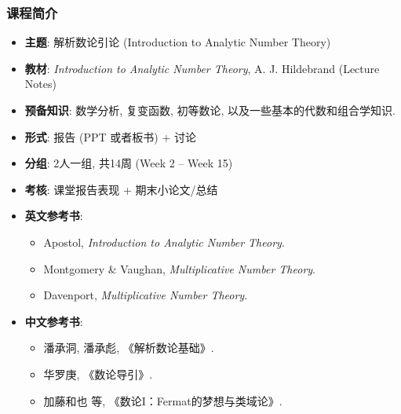 
\begin{frame}
\frametitle{课程简介}

\begin{itemize}
\item \textbf{主题}: 解析数论引论 (Introduction to Analytic Number Theory)
\item \textbf{教材}: \textit{Introduction to Analytic Number Theory}, A. J. Hildebrand (Lecture Notes)
\item \textbf{预备知识}: 数学分析, 复变函数, 初等数论, 以及一些基本的代数和组合学知识.
\item \textbf{形式}: 报告 (PPT 或者板书) + 讨论
\item \textbf{分组}: 2人一组, 共14周 (Week 2 -- Week 15)
\item \textbf{考核}: 课堂报告表现 + 期末小论文/总结
\pause
\item \textbf{英文参考书}:
\begin{itemize}
\item Apostol, \textit{Introduction to Analytic Number Theory}.
\item Montgomery \& Vaughan, \textit{Multiplicative Number Theory}.
\item Davenport, \textit{Multiplicative Number Theory}.
\end{itemize}
\item \textbf{中文参考书}:
\begin{itemize}
\item 潘承洞, 潘承彪, 《解析数论基础》.
\item 华罗庚, 《数论导引》.
\item 加藤和也 等, 《数论I：Fermat的梦想与类域论》.
\end{itemize}
\end{itemize}

\end{frame}


